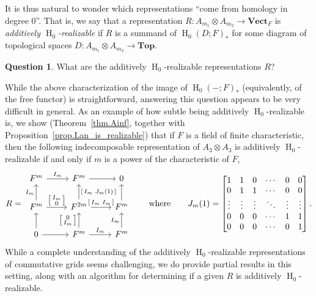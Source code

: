 \documentclass[a4paper]{amsart}
\theoremstyle{plain}
\theoremstyle{definition}
\newtheorem{question}[theorem]{Question}
\theoremstyle{remark}
\newcommand{\Top}{\mathbf{Top}}
\newcommand{\VectF}{\mathbf{Vect}_F}
\begin{document}
It is thus natural to wonder which representations ``come from homology in degree 0''. That is, we say that a representation $R \colon A_{m_1}\otimes A_{m_2} \to \VectF$ is \emph{additively $\operatorname{H}_0$-realizable} if $R$ is a summand of $\operatorname{H}_0(D;F)_*$ for some diagram of topological spaces $D \colon A_{m_1}\otimes A_{m_2} \to \Top$.

\begin{question} 
What are the additively $\operatorname{H}_0$-realizable representations $R$? 
\end{question}



While the above characterization of the image of $\operatorname{H}_0(-;F)_*$ (equivalently, of the free functor) is straightforward, answering this question appears to be very difficult in general.
As an example of how subtle being additively $\operatorname{H}_0$-realizable is, we show (Theorem~\ref{thm.Ainf}, together with Proposition~\ref{prop.Lan_is_realizable}) that if $F$ is a field of finite characteristic, then the following indecomposable representation of $A_3\otimes A_3$ is additively $\operatorname{H}_0$-realizable  if and only if $m$ is a power of the characteristic of $F$,
\[
R = \begin{tikzcd}[ampersand replacement = \&]
F^m \ar[r, "I_m"] \& F^m \ar[r]\& 0 \\
F^m \ar[u, "I_m"] \ar[r, "{\left[ \begin{smallmatrix} I_m \\ 0 \end{smallmatrix} \right]}"] \& F^{2m}\ar[u,swap, "{\left[ \begin{smallmatrix} I_m & J_m(1) \end{smallmatrix} \right]}"] \ar[r, "{\left[ \begin{smallmatrix} I_m & I_m \end{smallmatrix} \right]}"] \& F^m \ar[u] \\
0\ar[u]\ar[r] \& F^m \ar[u, "{\left[ \begin{smallmatrix} 0 \\ I_m \end{smallmatrix} \right]}"] \ar[r, "I_m"]  \& F^m\ar[u, "I_m"]\end{tikzcd}
\qquad \text{where}\qquad J_m(1) =
\begin{bmatrix}
 1 & 1 & 0& \cdots & 0 & 0 \\
 0 & 1 & 1 &\cdots & 0 & 0 \\
\vdots & \vdots & \vdots & \ddots & \vdots & \vdots \\
  0 & 0 & 0 & \cdots & 1 &  1\\
  0 & 0 & 0 & \cdots & 0 & 1
  \end{bmatrix}.
\]
While a complete understanding of the additively $\operatorname{H}_0$-realizable representations of commutative grids seems challenging, we do provide partial results in this setting, along with an algorithm for determining if a given $R$ is additively  $\operatorname{H}_0$-realizable. 
\end{document}
